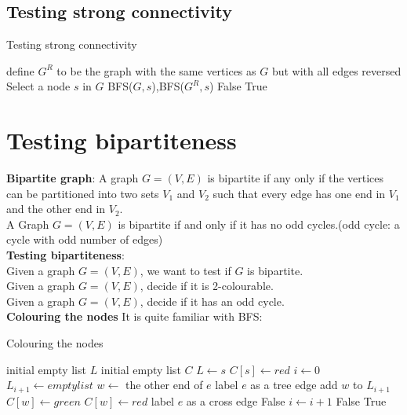 \documentclass[onecolumn]{report}
\begin{document}
\subsection{Testing strong connectivity}
\begin{algorithm}[H]
\caption{Testing strong connectivity}
\begin{algorithmic}[1]
\State define $G^R$ to be the graph with the same vertices as $G$ but with all edges reversed
\State Select a node $s$ in $G$
\State BFS($G,s$),BFS($G^R,s$)
\State \Return False
\EndIf
\EndFor
\State \Return True
\EndProcedure
\end{algorithmic}
\end{algorithm}

\section{Testing bipartiteness}
\textbf{Bipartite graph}: A graph $G=(V,E)$ is bipartite if any only if the vertices can be partitioned into two sets $V_1$ and $V_2$ such that every edge has one end in $V_1$ and the other end in $V_2$.\\
A Graph $G=(V,E)$ is bipartite if and only if it has no odd cycles.(odd cycle: a cycle with odd number of edges)\\
\noindent
\textbf{Testing bipartiteness}:\\
Given a graph $G=(V,E)$, we want to test if $G$ is bipartite.\\
Given a graph $G=(V,E)$, decide if it is 2-colourable.\\
Given a graph $G=(V,E)$, decide if it has an odd cycle.\\
\noindent
\textbf{Colouring the nodes}
It is quite familiar with BFS:\\
\begin{algorithm}[H]
\caption{Colouring the nodes}
\begin{algorithmic}[1]
\State initial empty list $L$
\State initial empty list $C$
\State $L \gets {s}$
\State $C[s] \gets red$
\State $i \gets 0$
\State $L_{i+1} \gets empty list$
\State $w \gets$ the other end of $e$
\State label $e$ as a tree edge
\State add $w$ to $L_{i+1}$
\State $C[w] \gets green$
\Else 
\State $C[w] \gets red$
\EndIf
\Else
\State label $e$ as a cross edge
\State \Return False
\EndIf
\EndIf
\EndIf
\EndFor
\EndFor
\State $i \gets i+1$
\EndWhile
{}
\State \Return False
\EndIf
\EndFor
\State \Return True
\EndProcedure
\end{algorithmic}
\end{algorithm}
\end{document}
